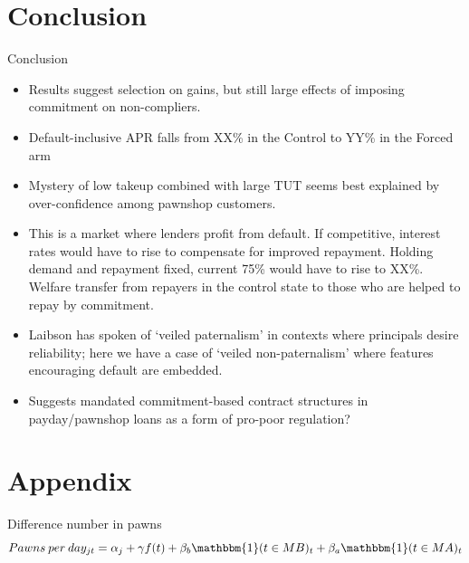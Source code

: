 \documentclass[8pt]{beamer}
\begin{document}
\section{Conclusion}
\begin{frame}{Conclusion}
    \begin{itemize}
        \item Results suggest selection on gains, but still large effects of imposing commitment on non-compliers.
        \item  Default-inclusive APR falls from XX\% in the Control to YY\% in the Forced arm
        \item Mystery of low takeup combined with large TUT seems best explained by over-confidence among pawnshop customers.
        \item  This is a market where lenders profit from default.  If competitive, interest rates would have to rise to compensate for improved repayment.  Holding demand and repayment fixed, current 75\% would have to rise to XX\%.  Welfare transfer from repayers in the control state to those who are helped to repay by commitment.
        \item Laibson has spoken of `veiled paternalism' in contexts where principals desire reliability; here we have a case of `veiled non-paternalism' where features encouraging default are embedded.
        \item Suggests mandated commitment-based contract structures in payday/pawnshop loans as a form of pro-poor regulation?
    \end{itemize}  
\end{frame}

\appendix

\section{Appendix}


\begin{frame}{Difference number in pawns}
    \[Pawns \: per \: day_{jt} = \alpha_j + \gamma f(t) + \beta_b \mathbbm{1}(t \in MB)_{t} +\beta_a \mathbbm{1}(t \in MA)_{t}\]
    
    \begin{table}[H]
\caption{Number of pawns balance before and after the experiment}
\label{num_pawns_bal}
\begin{center}
\scriptsize{}
\end{center}
\end{table}
\end{frame}
\end{document}
